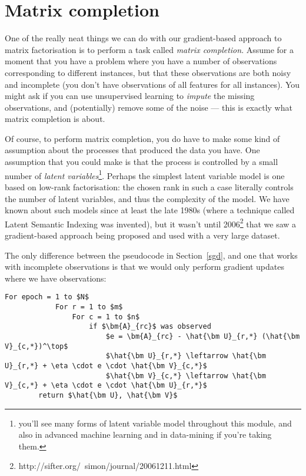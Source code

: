 \documentclass[a4paper]{article}
\begin{document}
\section{Matrix completion}
One of the really neat things we can do with our gradient-based approach to matrix factorisation is to perform a task called \emph{matrix completion}. Assume for a moment that you have a problem where you have a number of observations corresponding to different instances, but that these observations are both noisy and incomplete (you don't have observations of all features for all instances). You might ask if you can use unsupervised learning to \emph{impute} the missing observations, and (potentially) remove some of the noise --- this is exactly what matrix completion is about. 

Of course, to perform matrix completion, you do have to make some kind of assumption about the processes that produced the data you have. One assumption that you could make is that the process is controlled by a small number of \emph{latent variables}\footnote{you'll see many forms of latent variable model throughout this module, and also in advanced machine learning and in data-mining if you're taking them.}. Perhaps the simplest latent variable model is one based on low-rank  factorisation: the chosen rank in such a case literally controls the number of latent variables, and thus the complexity of the model. We have known about such models since at least the late 1980s (where a technique called Latent Semantic Indexing was invented), but it wasn't until 2006\footnote{http://sifter.org/~simon/journal/20061211.html} that we saw a gradient-based approach being proposed and used with a very large dataset. 

The only difference between the pseudocode in Section~\ref{sgd}, and one that works with incomplete observations is that we would only perform gradient updates where we have observations:

\begin{lstlisting}[mathescape=true,tabsize=4]
		For epoch = 1 to $N$
			For r = 1 to $m$
				For c = 1 to $n$
					if $\bm{A}_{rc}$ was observed
						$e = \bm{A}_{rc} - \hat{\bm U}_{r,*} (\hat{\bm V}_{c,*})^\top$
						$\hat{\bm U}_{r,*} \leftarrow \hat{\bm U}_{r,*} + \eta \cdot e \cdot \hat{\bm V}_{c,*}$
						$\hat{\bm V}_{c,*} \leftarrow \hat{\bm V}_{c,*} + \eta \cdot e \cdot \hat{\bm U}_{r,*}$
		return $\hat{\bm U}, \hat{\bm V}$
\end{lstlisting}
\end{document}
